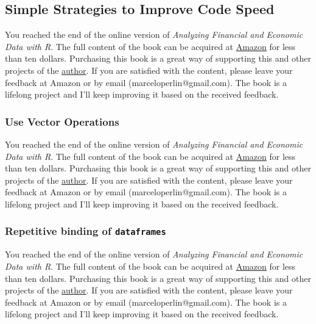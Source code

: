 \documentclass[
  12pt,
]{book}
\newenvironment{pleasebuyit}
{\begin{noteblock}
		
	} {\end{noteblock}}
\begin{document}
\hypertarget{simple-strategies-to-improve-code-speed}{%
\subsection{Simple Strategies to Improve Code Speed}\label{simple-strategies-to-improve-code-speed}}

\begin{pleasebuyit}
You reached the end of the online version of \emph{Analyzing Financial
and Economic Data with R}. The full content of the book can be acquired
at \href{https://www.amazon.com/dp/B084LSNXMN}{Amazon} for less than ten
dollars. Purchasing this book is a great way of supporting this and
other projects of the \href{https://www.msperlin.com/}{author}. If you
are satisfied with the content, please leave your feedback at Amazon or
by email (marceloperlin@gmail.com). The book is a lifelong project and
I'll keep improving it based on the received feedback.
\end{pleasebuyit}

\hypertarget{use-vector-operations}{%
\subsubsection{Use Vector Operations}\label{use-vector-operations}}

\begin{pleasebuyit}
You reached the end of the online version of \emph{Analyzing Financial
and Economic Data with R}. The full content of the book can be acquired
at \href{https://www.amazon.com/dp/B084LSNXMN}{Amazon} for less than ten
dollars. Purchasing this book is a great way of supporting this and
other projects of the \href{https://www.msperlin.com/}{author}. If you
are satisfied with the content, please leave your feedback at Amazon or
by email (marceloperlin@gmail.com). The book is a lifelong project and
I'll keep improving it based on the received feedback.
\end{pleasebuyit}

\hypertarget{repetitive-binding-of-dataframes}{%
\subsubsection{\texorpdfstring{Repetitive binding of \texttt{dataframes}}{Repetitive binding of dataframes}}\label{repetitive-binding-of-dataframes}}

\begin{pleasebuyit}
You reached the end of the online version of \emph{Analyzing Financial
and Economic Data with R}. The full content of the book can be acquired
at \href{https://www.amazon.com/dp/B084LSNXMN}{Amazon} for less than ten
dollars. Purchasing this book is a great way of supporting this and
other projects of the \href{https://www.msperlin.com/}{author}. If you
are satisfied with the content, please leave your feedback at Amazon or
by email (marceloperlin@gmail.com). The book is a lifelong project and
I'll keep improving it based on the received feedback.
\end{pleasebuyit}
\end{document}
